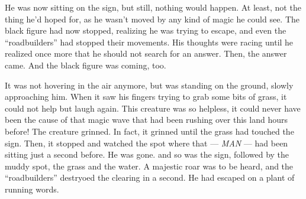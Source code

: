 \makehr{}

He was now sitting on the sign, but still, nothing would happen. At least, not the thing he'd hoped for, as he wasn't moved by any kind of magic he could see. The black figure had now stopped, realizing he was trying to escape, and even the \enquote{roadbuilders} had stopped their movements. His thoughts were racing until he realized once more that he should not search for an answer. Then, the answer came. 
And the black figure was coming, too.

It was not hovering in the air anymore, but was standing on the ground, slowly approaching him. When it saw his fingers trying to grab some bits of grass, it could not help but laugh again. This creature was so helpless, it could never have been the cause of that magic wave that had been rushing over this land hours before! 
The creature grinned. 
In fact, it grinned until the grass had touched the sign. Then, it stopped and watched the spot where that --- \emph{MAN} --- had been sitting just a second before. 
He was gone. 
and so was the sign, followed by the muddy spot, the grass and the water. A majestic roar was to be heard, and the \enquote{roadbuilders} destryoed the clearing in a second.
He had escaped on a plant of running words. 

